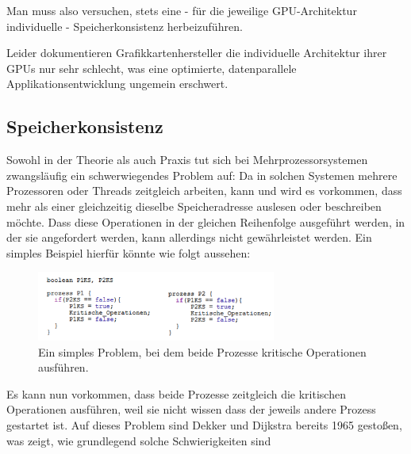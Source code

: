 \documentclass[final,bibliography=totocnumbered]{include/sikseminar}
\begin{document}
Man muss also versuchen, stets eine - für die jeweilige GPU-Architektur individuelle - Speicherkonsistenz herbeizuführen.
	
Leider dokumentieren Grafikkartenhersteller die individuelle Architektur ihrer GPUs nur sehr schlecht, was eine optimierte, datenparallele Applikationsentwicklung ungemein erschwert.











	\subsection{Speicherkonsistenz}


Sowohl in der Theorie als auch Praxis tut sich bei Mehrprozessorsystemen zwangsläufig ein schwerwiegendes Problem auf:
Da in solchen Systemen mehrere Prozessoren oder Threads zeitgleich arbeiten, kann und wird es vorkommen, dass mehr als einer gleichzeitig dieselbe Speicheradresse auslesen oder beschreiben möchte.
Dass diese Operationen in der gleichen Reihenfolge ausgeführt werden, in der sie angefordert werden, kann allerdings nicht gewährleistet werden.
Ein simples Beispiel hierfür könnte wie folgt aussehen:
\begin{figure}[htbp] %
  \centering
  \includegraphics[width=0.7\textwidth]{figures/problem1}
  \caption{Ein simples Problem, bei dem beide Prozesse kritische Operationen ausführen.}
  \label{Fig:problem1}
\end{figure}

Es kann nun vorkommen, dass beide Prozesse zeitgleich die kritischen Operationen ausführen, weil sie nicht wissen dass der jeweils andere Prozess gestartet ist\cite{ocofwmcm}.
Auf dieses Problem sind Dekker und Dijkstra bereits 1965 gestoßen, was zeigt, wie grundlegend solche Schwierigkeiten sind %
\end{document}
